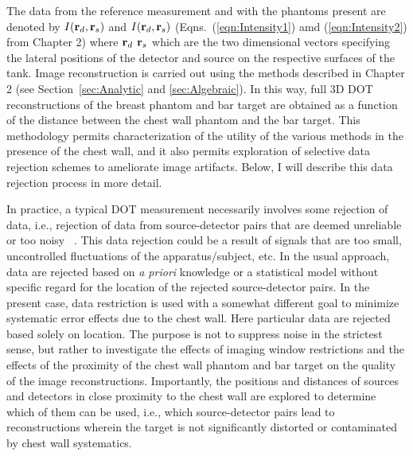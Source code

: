 The data from the reference measurement and with the phantoms present are denoted by $I(\mathbf{r}_d, \mathbf{r}_s)$ and $I(\mathbf{r}_d, \mathbf{r}_s)$ (Eqns.~(\ref{eqn:Intensity1}) amd (\ref{eqn:Intensity2}) from Chapter 2) where $\mathbf{r}_d$ $\mathbf{r}_s$ which are the two dimensional vectors specifying the lateral positions of the detector and source on the respective surfaces of the tank. Image reconstruction is carried out using the methods described in Chapter 2 (see Section~\ref{sec:Analytic} and \ref{sec:Algebraic}). In this way, full 3D DOT reconstructions of the breast phantom and bar target are obtained as a function of the distance between the chest wall phantom and the bar target. This methodology permits characterization of the utility of the various methods in the presence of the chest wall, and it also permits exploration of selective data rejection schemes to ameliorate image artifacts. Below, I will describe this data rejection process in more detail.

In practice, a typical DOT measurement necessarily involves some rejection of data, i.e., rejection of data from source-detector pairs that are deemed unreliable or too noisy ~\cite{Blasi2007,Franceschini2007,Roche-Labarbe2010,Orihuela-Espina2010}. This data rejection could be a result of signals that are too small, uncontrolled fluctuations of the apparatus/subject, etc. In the usual approach, data are rejected based on {\em a priori} knowledge or a statistical model without specific regard for the location of the rejected source-detector pairs. In the present case, data restriction is used with a somewhat different goal to minimize systematic error effects due to the chest wall. Here particular data are rejected based solely on location. The purpose is not to suppress noise in the strictest sense, but rather to investigate the effects of imaging window restrictions and the effects of the proximity of the chest wall phantom and bar target on the quality of the image reconstructions. Importantly, the positions and distances of sources and detectors in close proximity to the chest wall are explored to determine which of them can be used, i.e., which source-detector pairs lead to reconstructions wherein the target is not significantly distorted or contaminated by chest wall systematics.

